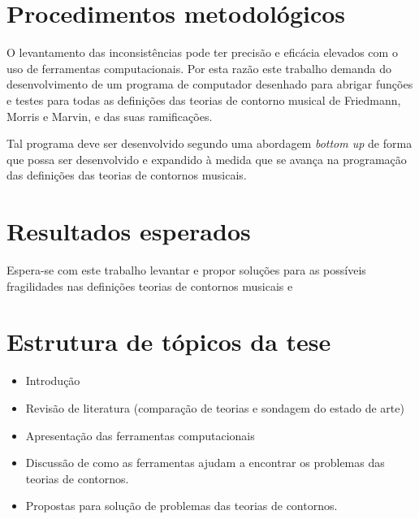 \documentclass[12pt]{article}
\newcommand{\eng}[1]{\textit{#1}}
\begin{document}
\section{Procedimentos metodológicos}
\label{sec:metodologia}

O levantamento das inconsistências pode ter precisão e eficácia
elevados com o uso de ferramentas computacionais. Por esta razão este
trabalho demanda do desenvolvimento de um programa de computador
desenhado para abrigar funções e testes para todas as definições das
teorias de contorno musical de Friedmann, Morris e Marvin, e das suas
ramificações.

Tal programa deve ser desenvolvido segundo uma abordagem \eng{bottom
  up} \cite{graham94:lisp} de forma que possa ser desenvolvido e
expandido à medida que se avança na programação das definições das
teorias de contornos musicais.




\section{Resultados esperados}
\label{sec:resultados-esperados}

Espera-se com este trabalho levantar e propor soluções para as
possíveis fragilidades nas definições teorias de contornos musicais e

\section{Estrutura de tópicos da tese}
\label{sec:estrutura-de-topicos}

\begin{itemize}
\item Introdução
\item Revisão de literatura (comparação de teorias e sondagem do
  estado de arte)
\item Apresentação das ferramentas computacionais
\item Discussão de como as ferramentas ajudam a encontrar os problemas
  das teorias de contornos.
\item Propostas para solução de problemas das teorias de contornos.
\end{itemize}
\end{document}
